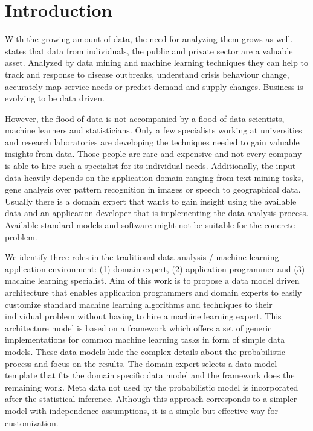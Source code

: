 \section{Introduction}

With the growing amount of data, the need for analyzing them grows as well. \textcite{forum2012bigdata} states that data from individuals, the public and private sector are a valuable asset. Analyzed by data mining and machine learning techniques they can help to track and response to disease outbreaks, understand crisis behaviour change, accurately map service needs or predict demand and supply changes. Business is evolving to be data driven.

However, the flood of data is not accompanied by a flood of data scientists, machine learners and statisticians. Only a few specialists working at universities and research laboratories are developing the techniques needed to gain valuable insights from data. Those people are rare and expensive and not every company is able to hire such a specialist for its individual needs. Additionally, the input data heavily depends on the application domain ranging from text mining tasks, gene analysis over pattern recognition in images or speech to geographical data. Usually there is a domain expert that wants to gain insight using the available data and an application developer that is implementing the data analysis process. Available standard models and software might not be suitable for the concrete problem.

We identify three roles in the traditional data analysis / machine learning application environment: (1) domain expert, (2) application programmer and (3) machine learning specialist. Aim of this work is to propose a data model driven architecture that enables application programmers and domain experts to easily customize standard machine learning algorithms and techniques to their individual problem without having to hire a machine learning expert. This architecture model is based on a framework which offers a set of generic implementations for common machine learning tasks in form of simple data models. These data models hide the complex details about the probabilistic process and focus on the results. The domain expert selects a data model template that fits the domain specific data model and the framework does the remaining work. Meta data not used by the probabilistic model is incorporated after the statistical inference. Although this approach corresponds to a simpler model with independence assumptions, it is a simple but effective way for customization.

